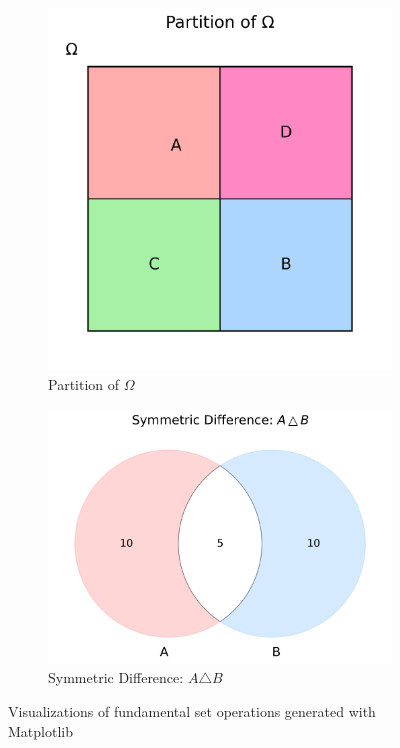 \begin{figure}[h]
    \vspace{0.5cm}
    
    \begin{subfigure}{0.48\textwidth}
        \includegraphics[width=\textwidth]{figures/set_operations/partition.png}
        \caption{Partition of $\Omega$}
        \label{fig:partition}
    \end{subfigure}
    \hfill
    \begin{subfigure}{0.48\textwidth}
        \includegraphics[width=\textwidth]{figures/set_operations/symmetric_difference.png}
        \caption{Symmetric Difference: $A \triangle B$}
        \label{fig:symmetric-difference}
    \end{subfigure}
    
    \caption{Visualizations of fundamental set operations generated with Matplotlib}
    \label{fig:set-operations}
\end{figure}

